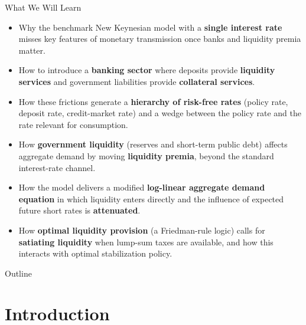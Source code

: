 \documentclass[11pt,aspectratio=169]{beamer}
\begin{document}
\begin{frame}{What We Will Learn}
\small
\begin{itemize}
  \item Why the benchmark New Keynesian model with a \textbf{single interest rate} misses key features of monetary transmission once banks and liquidity premia matter.
  \item How to introduce a \textbf{banking sector} where deposits provide \textbf{liquidity services} and government liabilities provide \textbf{collateral services}.
  \item How these frictions generate a \textbf{hierarchy of risk-free rates} (policy rate, deposit rate, credit-market rate) and a wedge between the policy rate and the rate relevant for consumption.
  \item How \textbf{government liquidity} (reserves and short-term public debt) affects aggregate demand by moving \textbf{liquidity premia}, beyond the standard interest-rate channel.
  \item How the model delivers a modified \textbf{log-linear aggregate demand equation} in which liquidity enters directly and the influence of expected future short rates is \textbf{attenuated}.
  \item How \textbf{optimal liquidity provision} (a Friedman-rule logic) calls for \textbf{satiating liquidity} when lump-sum taxes are available, and how this interacts with optimal stabilization policy.
\end{itemize}
\end{frame}


\begin{frame}{Outline}
\tableofcontents
\end{frame}


\section{Introduction}
\end{document}
